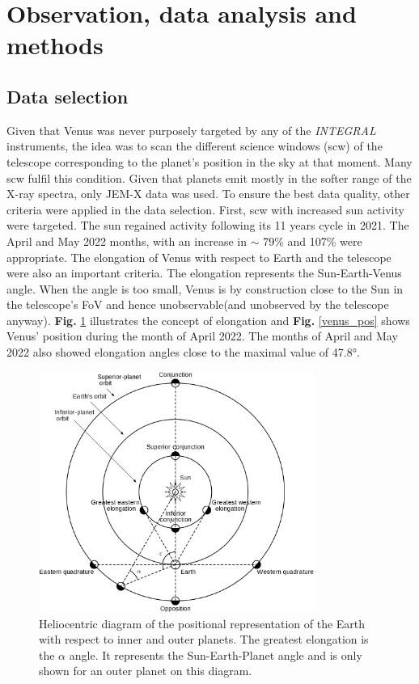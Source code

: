 \section{Observation, data analysis and methods}

    \subsection{Data selection}
        Given that Venus was never purposely targeted by any of the \textit{INTEGRAL} instruments, the idea was to scan the different science windows (scw) of the
        telescope corresponding to the planet's position in the sky at that moment. Many scw fulfil this condition. Given that planets emit mostly in the softer range
        of the X-ray spectra, only JEM-X data was used. To ensure the best data quality, other criteria 
        were applied in the data selection. First, scw with increased sun activity were targeted. The sun regained activity following its 11 years cycle in 2021. 
        The April and May 2022 months, with an increase in $\sim$ 79\% and 107\% were appropriate. The elongation of Venus with respect to Earth and the telescope
        were also an important criteria. The elongation represents the Sun-Earth-Venus angle. When the angle is too small, Venus is by construction close to the Sun in the telescope's FoV and hence unobservable(and unobserved by the telescope anyway). \textbf{Fig.} \ref{elongation} illustrates the concept of elongation and \textbf{Fig.} \ref{venus_pos} shows Venus' position during the month of April 2022. The months of April and May 2022 also showed elongation angles close to the maximal value of 47.8°.

    \begin{figure}[H]
        \centering
        \includegraphics[width = 9cm]{report/Figures/methods/Positional_astronomy.png}
        \caption{Heliocentric diagram of the positional representation of the Earth with respect to inner and outer planets. The greatest elongation is the $\alpha$ angle. It represents the Sun-Earth-Planet angle and is only shown for an outer planet on this diagram.}
        \label{elongation}
    \end{figure}
    
